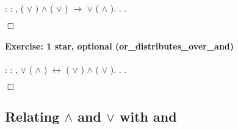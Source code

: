\documentclass[12pt]{report}
\begin{document}
\begin{coqdoccode}
\coqdocnoindent
{}  : \coqdockw{\ensuremath{\forall}}    : ,\coqdoceol
\coqdocindent{1.00em}
( \ensuremath{\lor} ) \ensuremath{\land} ( \ensuremath{\lor} ) \ensuremath{\rightarrow}  \ensuremath{\lor} ( \ensuremath{\land} ).\coqdoceol
\coqdocnoindent
{}.\coqdoceol
 .\coqdoceol
\end{coqdoccode}
\ensuremath{\Box} 

\paragraph{Exercise: 1 star, optional (or\_distributes\_over\_and)}

\begin{coqdoccode}
\coqdocnoindent
{}  : \coqdockw{\ensuremath{\forall}}    : ,\coqdoceol
\coqdocindent{1.00em}
 \ensuremath{\lor} ( \ensuremath{\land} ) \ensuremath{\leftrightarrow} ( \ensuremath{\lor} ) \ensuremath{\land} ( \ensuremath{\lor} ).\coqdoceol
\coqdocnoindent
{}.\coqdoceol
 .\coqdoceol
\end{coqdoccode}
\ensuremath{\Box} \begin{coqdoccode}
\coqdocemptyline
\end{coqdoccode}
\subsection{Relating \ensuremath{\land} and \ensuremath{\lor} with \texorpdfstring{\protect}{andb} and \texorpdfstring{\protect}{orb}}
\end{document}
